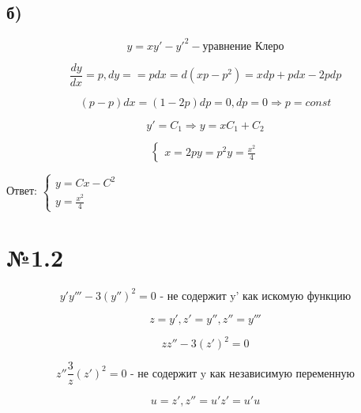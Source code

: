 \documentclass{article}
\begin{document}
\subsection*{б)}

\begin{equation*}
    y = xy' - {y'}^2 - \text{уравнение Клеро}
\end{equation*}

\begin{equation*}
    \frac{dy}{dx} = p , dy = = pdx = d (xp - p^2) = xdp + pdx - 2pdp
\end{equation*}

\begin{equation*}
    (p - p)dx = (1 - 2p)dp = 0, dp = 0 \Rightarrow p = const
\end{equation*}

\begin{equation*}
    y' = C_1 \Rightarrow y = xC_1 + C_2
\end{equation*}

\begin{equation*}
    \begin{cases}
    x = 2p
    y = p^2
    y = \frac{x^2}{4}
    \end{cases}
\end{equation*}

Ответ: $\begin{cases}
y = Cx - C^2 \\
y = \frac{x^2}{4}
\end{cases}$
\section*{№1.2}
\begin{equation*}
    y'y''' - 3 (y'')^2 = 0 \text{ - не содержит y' как искомую функцию}
\end{equation*}

\begin{equation*}
    z = y', z' = y'', z'' = y'''
\end{equation*}

\begin{equation*}
    zz'' - 3(z')^2 = 0
\end{equation*}

\begin{equation*}
    z'' \frac{3}{z}(z')^2 = 0 \text{ - не содержит y как независимую переменную}
\end{equation*}

\begin{equation*}
    u = z', z'' = u'z' = u'u
\end{equation*}
\end{document}

